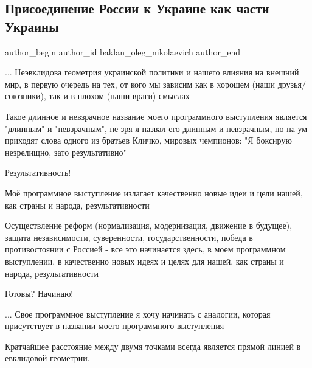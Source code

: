  
 
 
 
 
 
\subsection{Присоединение России к Украине как части Украины}
\label{sec:03_09_2021.fb.baklan_oleg_nikolaevich.1.rossia_ukraina_prisoedinenie}
 
\ifcmt
 author_begin
   author_id baklan_oleg_nikolaevich
 author_end
\fi

... Неэвклидова геометрия украинской политики и нашего влияния на внешний мир,
в первую очередь на тех, от кого мы зависим как в хорошем (наши
друзья/союзники), так и в плохом (наши враги) смыслах 

Такое длинное и невзрачное название моего программного выступления является
"длинным" и "невзрачным", не зря я назвал его длинным и невзрачным, но на ум
приходят слова одного из братьев Кличко, мировых чемпионов: "Я боксирую
незрелищно, зато результативно"

Результативность!

Моё программное выступление излагает качественно новые идеи и цели нашей, как
страны и народа, результативности

Осуществление реформ (нормализация, модернизация, движение в будущее), защита
независимости, суверенности, государственности, победа в противостоянии с
Россией - все это начинается здесь, в моем программном выступлении, в
качественно новых идеях и целях для нашей, как страны и народа,
результативности

Готовы?
Начинаю! 

... Свое программное выступление я хочу начинать с аналогии, которая
присутствует в названии моего программного выступления

Кратчайшее расстояние между двумя точками всегда является прямой линией в
евклидовой геометрии.

